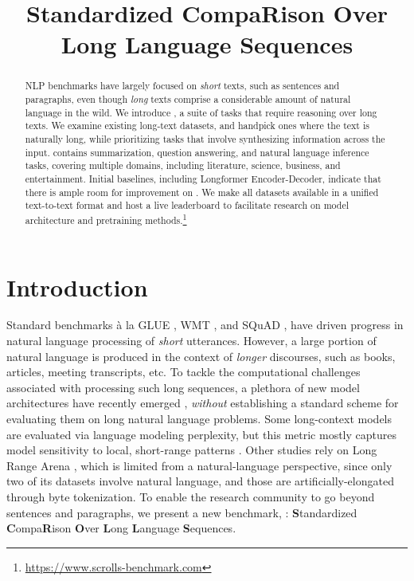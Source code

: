 \title{Standardized CompaRison Over Long Language Sequences}

\begin{abstract}
NLP benchmarks have largely focused on \textit{short} texts, such as sentences and paragraphs, even though \textit{long} texts comprise a considerable amount of natural language in the wild. We introduce \scrolls{}, a suite of tasks that require reasoning over long texts. We examine existing long-text datasets, and handpick ones where the text is naturally long, while prioritizing tasks that involve synthesizing information across the input.
    \scrolls{} contains summarization, question answering, and natural language inference tasks, covering multiple domains, including literature, science, business, and entertainment. Initial baselines, including Longformer Encoder-Decoder, indicate that there is ample room for improvement on \scrolls{}.
        We make all datasets available in a unified text-to-text format and host a live leaderboard to facilitate research on model architecture and pretraining methods.\footnote{\label{website}\url{https://www.scrolls-benchmark.com}}
\end{abstract}

\section{Introduction}
\label{sec:introduction}

Standard benchmarks à la GLUE \cite{wang-etal-2018-glue, NEURIPS2019_4496bf24}, WMT \cite{barrault-etal-2019-findings, barrault-etal-2020-findings}, and SQuAD \cite{rajpurkar-etal-2016-squad, rajpurkar-etal-2018-know}, have driven progress in natural language processing of \textit{short} utterances. However, a large portion of natural language is produced in the context of \textit{longer} discourses, such as books, articles, meeting transcripts, etc. To tackle the computational challenges associated with processing such long sequences, a plethora of new model architectures have recently emerged \cite{tay2020efficient, fournier2021practical},
\textit{without} establishing a standard scheme for evaluating them on long natural language problems. Some long-context models are evaluated via language modeling perplexity, but this metric mostly captures model sensitivity to local, short-range patterns \cite{khandelwal-etal-2018-sharp, sun-etal-2021-long}. Other studies rely on Long Range Arena \cite{tay2021long}, which is limited from a natural-language perspective, since only two of its datasets involve natural language, and those are artificially-elongated through byte tokenization. To enable the research community to go beyond sentences and paragraphs, we present a new benchmark, \textbf{\scrolls{}}: \textbf{S}tandardized \textbf{C}ompa\textbf{R}ison \textbf{O}ver \textbf{L}ong \textbf{L}anguage \textbf{S}equences. 

